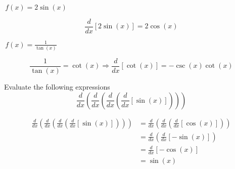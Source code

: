 \documentclass[addpoints]{exam}
\theoremstyle{definition}
\theoremstyle{plain}
\begin{document}
\begin{questions}
    \question $\displaystyle\,f(x)=2\sin\left(x\right)$
    \begin{solution}[\stretch{0.5}]
        \[ \frac{d}{dx}\left[2\sin\left(x\right)\right] = 2\cos\left(x\right) \]
    \end{solution}
    
    \question $\displaystyle\,f(x)=\frac{1}{\tan\left(x\right)}$
    \begin{solution}[\stretch{0.5}]
        \[ \frac{1}{\tan\left(x\right)} = \cot\left(x\right) \Rightarrow \frac{d}{dx}\left[\cot\left(x\right)\right] = -\csc\left(x\right)\cot\left(x\right) \]
    \end{solution}
    
    \question Evaluate the following expressions 
    \vspace{0.1in}\newline
    \[ \frac{d}{dx}\left(\frac{d}{dx}\left(\frac{d}{dx}\left(\frac{d}{dx}\left[\sin\left(x\right)\right]\right)\right)\right) \]
    \begin{solution}[\stretch{1}]
        \vspace{0.1in}\newline
        \begin{align*}
            \frac{d}{dx}\left(\frac{d}{dx}\left(\frac{d}{dx}\left(\frac{d}{dx}\left[\sin\left(x\right)\right]\right)\right)\right) &= 
            \frac{d}{dx}\left(\frac{d}{dx}\left(\frac{d}{dx}\left[\cos\left(x\right)\right]\right)\right) \\
            &= \frac{d}{dx}\left(\frac{d}{dx}\left[-\sin\left(x\right)\right]\right) \\
            &= \frac{d}{dx}\left[-\cos\left(x\right)\right] \\
            &= \boxed{\sin\left(x\right)} \\
        \end{align*}
    \end{solution}
\end{questions}

\newpage 
\end{document}
